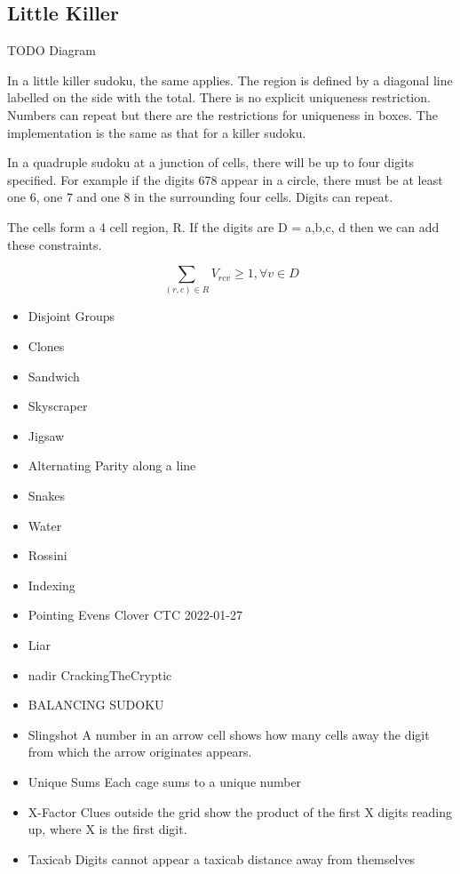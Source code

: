 \documentclass{article}
\begin{document}

\subsection{Little Killer}

TODO Diagram

In a little killer sudoku, the same applies. The region is defined by a diagonal line labelled on the side with the total. There is no explicit uniqueness restriction. Numbers can repeat but there are the restrictions for uniqueness in boxes. 
The implementation is the same as that for a killer sudoku. 

In a quadruple sudoku at a junction of cells, there will be up to four digits specified. For example if the digits 678 appear in a circle, there must be at least one 6, one 7 and one 8 in the surrounding four cells. Digits can repeat. 

The cells form a 4 cell region, R.  If the digits are D = {a,b,c, d} then we can add these constraints. 

\begin{equation}
\sum_{(r,c) \in R} V_{rcv} \geq 1, \forall v \in D
\end{equation}



\begin{itemize}
\item Disjoint Groups
\item Clones
\item Sandwich
\item Skyscraper
\item Jigsaw
\item Alternating Parity along a line
\item Snakes
\item Water
\item Rossini 
\item Indexing
\item Pointing Evens	Clover CTC 2022-01-27
\item Liar
\item nadir	CrackingTheCryptic
\item BALANCING SUDOKU 
\item Slingshot	A number in an arrow cell shows how many cells away the digit from which the arrow originates appears.
\item Unique Sums	Each cage sums to a unique number
\item X-Factor		Clues outside the grid show the product of the first X digits reading up, where X is the first digit.
\item Taxicab			Digits cannot appear a taxicab distance away from themselves

\end{itemize}
\end{document}
